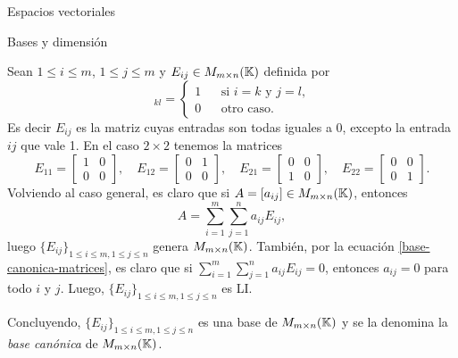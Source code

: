 \begin{chapter}{Espacios vectoriales}
\begin{section}{Bases y dimensi\'on}
\begin{ejemplo*} 
    Sean $1 \le i \le m$, $1\le j \le m$ y $E_{ij} \in M_{m \times n}(\mathbb K)$ definida por
    \begin{equation*}
        [E_{ij}]_{kl} = \left\{ 
        \begin{array}{lll}
        1& &\text{si $i=k$ y $j=l$,} \\
        0& &\text{otro caso}. 
        \end{array}
         \right.
    \end{equation*}
    Es decir $E_{ij}$  es la matriz cuyas entradas son todas iguales a 0,  excepto la entrada $ij$ que vale 1. En el caso $2 \times 2$  tenemos la matrices
    \begin{equation*}
        E_{11} = \begin{bmatrix} 1&0\\0&0\end{bmatrix}, \quad
        E_{12} = \begin{bmatrix} 0&1\\0&0\end{bmatrix}, \quad
        E_{21} = \begin{bmatrix} 0&0\\1&0\end{bmatrix}, \quad
        E_{22} = \begin{bmatrix} 0&0\\0&1\end{bmatrix}.
    \end{equation*}
    Volviendo al caso general,  es claro que si $A= [a_{ij}] \in M_{m \times n}(\mathbb K)$,  entonces
    \begin{equation}\label{base-canonica-matrices}
        A = \sum_{i=1}^{m} \sum_{j=1}^{n} a_{ij}E_{ij},
    \end{equation}
    luego $\{E_{ij} \}_{1 \le i \le m, 1\le j \le n}$ genera $M_{m \times n}(\mathbb K)$. También, por la ecuación \eqref{base-canonica-matrices}, es claro que si $\sum_{i=1}^{m} \sum_{j=1}^{n} a_{ij}E_{ij}=0$,  entonces $a_{ij}=0$ para todo $i$ y $j$. Luego,  $\{E_{ij} \}_{1 \le i \le m, 1\le j \le n}$ es LI. 
    
    Concluyendo,  $\{E_{ij} \}_{1 \le i \le m, 1\le j \le n}$ es una base de  $M_{m \times n}(\mathbb K)$ y se la denomina la \textit{base canónica} de  $M_{m \times n}(\mathbb K)$.
\end{ejemplo*}


\end{section}
\end{chapter}
